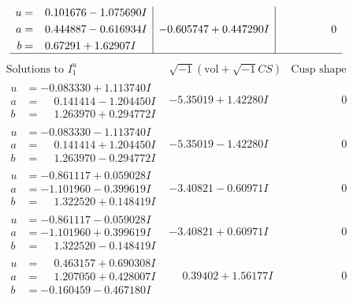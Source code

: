 \documentclass[1p]{elsarticle_modified}
\theoremstyle{definition}
\newcommand{\I}{\sqrt{-1}}
\begin{document}
$$\begin{array}{c|c|c}
\begin{aligned}
u &= \phantom{-}0.101676 - 1.075690 I \\
a &= \phantom{-}0.444887 - 0.616934 I \\
b &= \phantom{-}0.67291 + 1.62907 I\end{aligned}
 & -0.605747 + 0.447290 I & \phantom{-0.000000 } 0\\
 \hline 
 \end{array}$$\newpage$$\begin{array}{c|c|c}  
\text{Solutions to }I^u_{1}& \I (\text{vol} + \sqrt{-1}CS) & \text{Cusp shape}\\
 \hline 
\begin{aligned}
u &= -0.083330 + 1.113740 I \\
a &= \phantom{-}0.141414 - 1.204450 I \\
b &= \phantom{-}1.263970 + 0.294772 I\end{aligned}
 & -5.35019 + 1.42280 I & \phantom{-0.000000 } 0 \\ \hline\begin{aligned}
u &= -0.083330 - 1.113740 I \\
a &= \phantom{-}0.141414 + 1.204450 I \\
b &= \phantom{-}1.263970 - 0.294772 I\end{aligned}
 & -5.35019 - 1.42280 I & \phantom{-0.000000 } 0 \\ \hline\begin{aligned}
u &= -0.861117 + 0.059028 I \\
a &= -1.101960 - 0.399619 I \\
b &= \phantom{-}1.322520 + 0.148419 I\end{aligned}
 & -3.40821 - 0.60971 I & \phantom{-0.000000 } 0 \\ \hline\begin{aligned}
u &= -0.861117 - 0.059028 I \\
a &= -1.101960 + 0.399619 I \\
b &= \phantom{-}1.322520 - 0.148419 I\end{aligned}
 & -3.40821 + 0.60971 I & \phantom{-0.000000 } 0 \\ \hline\begin{aligned}
u &= \phantom{-}0.463157 + 0.690308 I \\
a &= \phantom{-}1.207050 + 0.428007 I \\
b &= -0.160459 - 0.467180 I\end{aligned}
 & \phantom{-}0.39402 + 1.56177 I & \phantom{-0.000000 } 0 \\ \hline\begin{aligned}

\end{aligned}
\end{array}$$
\end{document}
